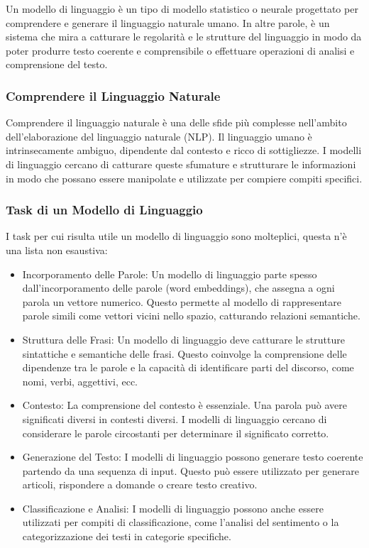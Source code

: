Un modello di linguaggio è un tipo di modello statistico o neurale progettato per comprendere e generare il linguaggio naturale umano. In altre parole, è un sistema che mira a catturare le regolarità e le strutture del linguaggio in modo da poter produrre testo coerente e comprensibile o effettuare operazioni di analisi e comprensione del testo.

\subsubsection{Comprendere il Linguaggio Naturale}
Comprendere il linguaggio naturale è una delle sfide più complesse nell'ambito dell'elaborazione del linguaggio naturale (NLP). Il linguaggio umano è intrinsecamente ambiguo, dipendente dal contesto e ricco di sottigliezze. I modelli di linguaggio cercano di catturare queste sfumature e strutturare le informazioni in modo che possano essere manipolate e utilizzate per compiere compiti specifici.

\subsubsection{Task di un Modello di Linguaggio}
I task per cui risulta utile un modello di linguaggio sono molteplici, questa n'è una lista non esaustiva:

\begin{itemize}
    \item Incorporamento delle Parole: Un modello di linguaggio parte spesso dall'incorporamento delle parole (word embeddings), che assegna a ogni parola un vettore numerico. Questo permette al modello di rappresentare parole simili come vettori vicini nello spazio, catturando relazioni semantiche.
    \item Struttura delle Frasi: Un modello di linguaggio deve catturare le strutture sintattiche e semantiche delle frasi. Questo coinvolge la comprensione delle dipendenze tra le parole e la capacità di identificare parti del discorso, come nomi, verbi, aggettivi, ecc.
    \item Contesto: La comprensione del contesto è essenziale. Una parola può avere significati diversi in contesti diversi. I modelli di linguaggio cercano di considerare le parole circostanti per determinare il significato corretto.
    \item Generazione del Testo: I modelli di linguaggio possono generare testo coerente partendo da una sequenza di input. Questo può essere utilizzato per generare articoli, rispondere a domande o creare testo creativo.
    \item Classificazione e Analisi: I modelli di linguaggio possono anche essere utilizzati per compiti di classificazione, come l'analisi del sentimento o la categorizzazione dei testi in categorie specifiche.
\end{itemize}

